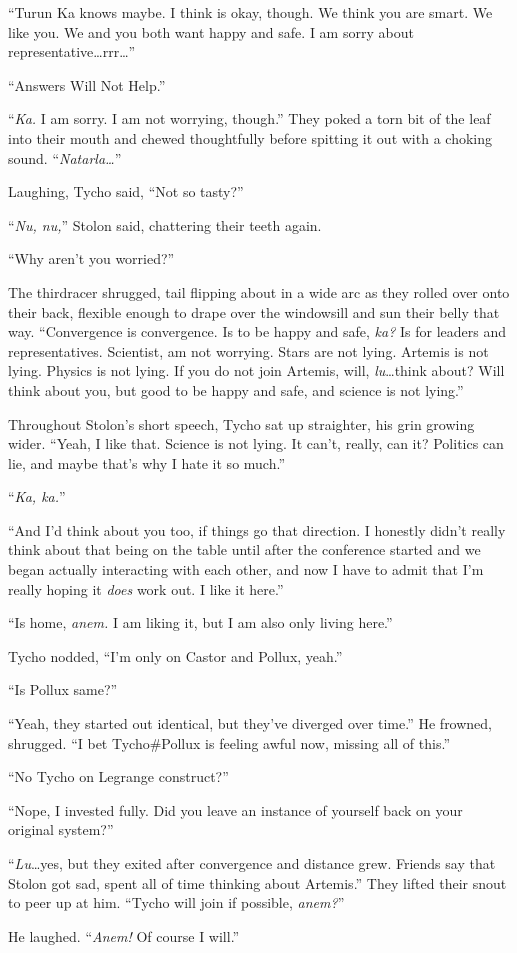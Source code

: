 ``Turun Ka knows maybe. I think is okay, though. We think you are smart. We like you. We and you both want happy and safe. I am sorry about representative\ldots rrr\ldots{}''

``Answers Will Not Help.''

``\emph{Ka.} I am sorry. I am not worrying, though.'' They poked a torn bit of the leaf into their mouth and chewed thoughtfully before spitting it out with a choking sound. ``\emph{Natarla\ldots{}}''

Laughing, Tycho said, ``Not so tasty?''

``\emph{Nu, nu,}'' Stolon said, chattering their teeth again.

``Why aren't you worried?''

The thirdracer shrugged, tail flipping about in a wide arc as they rolled over onto their back, flexible enough to drape over the windowsill and sun their belly that way. ``Convergence is convergence. Is to be happy and safe, \emph{ka?} Is for leaders and representatives. Scientist, am not worrying. Stars are not lying. Artemis is not lying. Physics is not lying. If you do not join Artemis, will, \emph{lu}\ldots think about? Will think about you, but good to be happy and safe, and science is not lying.''

Throughout Stolon's short speech, Tycho sat up straighter, his grin growing wider. ``Yeah, I like that. Science is not lying. It can't, really, can it? Politics can lie, and maybe that's why I hate it so much.''

``\emph{Ka, ka.}''

``And I'd think about you too, if things go that direction. I honestly didn't really think about that being on the table until after the conference started and we began actually interacting with each other, and now I have to admit that I'm really hoping it \emph{does} work out. I like it here.''

``Is home, \emph{anem.} I am liking it, but I am also only living here.''

Tycho nodded, ``I'm only on Castor and Pollux, yeah.''

``Is Pollux same?''

``Yeah, they started out identical, but they've diverged over time.'' He frowned, shrugged. ``I bet Tycho\#Pollux is feeling awful now, missing all of this.''

``No Tycho on Legrange construct?''

``Nope, I invested fully. Did you leave an instance of yourself back on your original system?''

``\emph{Lu}\ldots yes, but they exited after convergence and distance grew. Friends say that Stolon got sad, spent all of time thinking about Artemis.'' They lifted their snout to peer up at him. ``Tycho will join if possible, \emph{anem?}''

He laughed. ``\emph{Anem!} Of course I will.''
